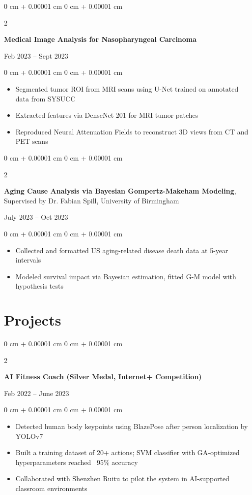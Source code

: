 \documentclass[10pt, letterpaper]{article}
\newenvironment{highlights}{
    \begin{itemize}[
        topsep=0.10 cm,
        parsep=0.10 cm,
        partopsep=0pt,
        itemsep=0pt,
        leftmargin=0 cm + 10pt
    ]
}{
    \end{itemize}
} %
\newenvironment{onecolentry}{
    \begin{adjustwidth}{
        0 cm + 0.00001 cm
    }{
        0 cm + 0.00001 cm
    }
}{
    \end{adjustwidth}
} %
\newenvironment{twocolentry}[2][]{
    \onecolentry
    \def\secondColumn{#2}
    \setcolumnwidth{\fill, 4.5 cm}
    \begin{paracol}{2}
}{
    \switchcolumn \raggedleft \secondColumn
    \end{paracol}
    \endonecolentry
} %
\begin{document}
    \begin{twocolentry}{
        Feb 2023 -- Sept 2023
    }
        \textbf{Medical Image Analysis for Nasopharyngeal Carcinoma}
    \end{twocolentry}

    \vspace{0.10 cm}
    \begin{onecolentry}
        \begin{highlights}
            \item Segmented tumor ROI from MRI scans using U-Net trained on annotated data from SYSUCC
            \item Extracted features via DenseNet-201 for MRI tumor patches
            \item Reproduced Neural Attenuation Fields to reconstruct 3D views from CT and PET scans
        \end{highlights}
    \end{onecolentry}

    \begin{twocolentry}{
        July 2023 -- Oct 2023
    }
        \textbf{Aging Cause Analysis via Bayesian Gompertz-Makeham Modeling}, 
        \\ Supervised by Dr. Fabian Spill, University of Birmingham
    \end{twocolentry}

    \vspace{0.10 cm}
    \begin{onecolentry}
        \begin{highlights}
            \item Collected and formatted US aging-related disease death data at 5-year intervals
            \item Modeled survival impact via Bayesian estimation, fitted G-M model with hypothesis tests
        \end{highlights}
    \end{onecolentry}

\section{Projects}

    \begin{twocolentry}{
        Feb 2022 -- June 2023
    }
        \textbf{AI Fitness Coach (Silver Medal, Internet+ Competition)}
    \end{twocolentry}

    \vspace{0.10 cm}
    \begin{onecolentry}
        \begin{highlights}
            \item Detected human body keypoints using BlazePose after person localization by YOLOv7
            \item Built a training dataset of 20+ actions; SVM classifier with GA-optimized hyperparameters reached ~95\% accuracy
            \item Collaborated with Shenzhen Ruitu to pilot the system in AI-supported classroom environments
        \end{highlights}
    \end{onecolentry}
\end{document}
